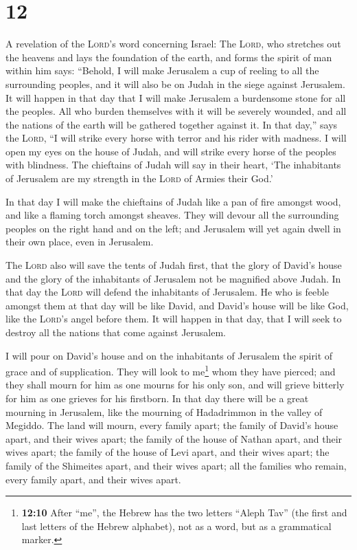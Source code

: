 \hypertarget{section-11}{%
\section{12}\label{section-11}}

 A revelation of the \textsc{Lord}'s word concerning
Israel: The \textsc{Lord}, who stretches out the heavens and lays the
foundation of the earth, and forms the spirit of man within him says:
 ``Behold, I will make Jerusalem a cup of reeling to all
the surrounding peoples, and it will also be on Judah in the siege
against Jerusalem.  It will happen in that day that I will
make Jerusalem a burdensome stone for all the peoples. All who burden
themselves with it will be severely wounded, and all the nations of the
earth will be gathered together against it.  In that
day,'' says the \textsc{Lord}, ``I will strike every horse with terror
and his rider with madness. I will open my eyes on the house of Judah,
and will strike every horse of the peoples with blindness.
 The chieftains of Judah will say in their heart, `The
inhabitants of Jerusalem are my strength in the \textsc{Lord} of Armies
their God.'

 In that day I will make the chieftains of Judah like a
pan of fire amongst wood, and like a flaming torch amongst sheaves. They
will devour all the surrounding peoples on the right hand and on the
left; and Jerusalem will yet again dwell in their own place, even in
Jerusalem.

 The \textsc{Lord} also will save the tents of Judah
first, that the glory of David's house and the glory of the inhabitants
of Jerusalem not be magnified above Judah.  In that day
the \textsc{Lord} will defend the inhabitants of Jerusalem. He who is
feeble amongst them at that day will be like David, and David's house
will be like God, like the \textsc{Lord}'s angel before them.
 It will happen in that day, that I will seek to destroy
all the nations that come against Jerusalem.

 I will pour on David's house and on the inhabitants of
Jerusalem the spirit of grace and of supplication. They will look to
me\footnote{\textbf{12:10} After ``me'', the Hebrew has the two letters
  ``Aleph Tav'' (the first and last letters of the Hebrew alphabet), not
  as a word, but as a grammatical marker.} whom they have pierced; and
they shall mourn for him as one mourns for his only son, and will grieve
bitterly for him as one grieves for his firstborn.  In
that day there will be a great mourning in Jerusalem, like the mourning
of Hadadrimmon in the valley of Megiddo.  The land will
mourn, every family apart; the family of David's house apart, and their
wives apart; the family of the house of Nathan apart, and their wives
apart;  the family of the house of Levi apart, and their
wives apart; the family of the Shimeites apart, and their wives apart;
 all the families who remain, every family apart, and
their wives apart.

